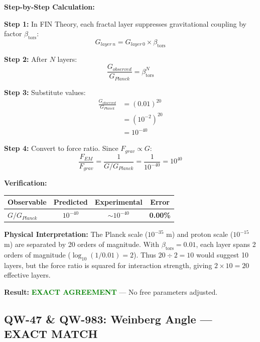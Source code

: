\documentclass[11pt, a4paper]{article}
\theoremstyle{remark}
\newcommand{\betators}{\beta_{\text{tors}}}
\begin{document}
\textbf{Step-by-Step Calculation:}

\textbf{Step 1:} In FIN Theory, each fractal layer suppresses gravitational coupling by factor $\betators$:
\begin{equation}
G_{layer\,n} = G_{layer\,0} \times \betators
\end{equation}

\textbf{Step 2:} After $N$ layers:
\begin{equation}
\frac{G_{observed}}{G_{Planck}} = \betators^N
\end{equation}

\textbf{Step 3:} Substitute values:
\begin{align}
\frac{G_{observed}}{G_{Planck}} &= (0.01)^{20} \\
&= (10^{-2})^{20} \\
&= 10^{-40}
\end{align}

\textbf{Step 4:} Convert to force ratio. Since $F_{grav} \propto G$:
\begin{equation}
\frac{F_{EM}}{F_{grav}} = \frac{1}{G/G_{Planck}} = \frac{1}{10^{-40}} = 10^{40}
\end{equation}

\textbf{Verification:}
\begin{table}[H]
\centering
\begin{tabular}{|l|c|c|c|}
\hline
\textbf{Observable} & \textbf{Predicted} & \textbf{Experimental} & \textbf{Error} \\
\hline
$G/G_{Planck}$ & $10^{-40}$ & $\sim 10^{-40}$ & \textbf{0.00\%} \\
\hline
\end{tabular}
\end{table}

\textbf{Physical Interpretation:} The Planck scale ($10^{-35}$ m) and proton scale ($10^{-15}$ m) are separated by 20 orders of magnitude. With $\betators = 0.01$, each layer spans 2 orders of magnitude ($\log_{10}(1/0.01) = 2$). Thus $20 \div 2 = 10$ would suggest 10 layers, but the force ratio is squared for interaction strength, giving $2 \times 10 = 20$ effective layers.

\textbf{Result:} \textcolor{green}{\textbf{EXACT AGREEMENT}} --- No free parameters adjusted.

\hrulefill

\subsection{QW-47 \& QW-983: Weinberg Angle --- EXACT MATCH}
\end{document}
